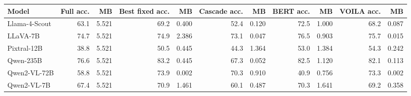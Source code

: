 \begin{tabular}{lrrrrrrrrrr}
\toprule
Model & Full acc. & MB & Best fixed acc. & MB & Cascade acc. & MB & BERT acc. & MB & VOILA acc. & MB \\
\midrule
Llama-4-Scout & 63.1 & 5.521 & 69.2 & 0.400 & 52.4 & 0.120 & 72.5 & 1.000 & 68.2 & 0.087 \\
LLaVA-7B & 74.7 & 5.521 & 74.9 & 2.386 & 73.1 & 0.047 & 76.5 & 0.903 & 75.7 & 0.015 \\
Pixtral-12B & 38.8 & 5.521 & 50.5 & 0.445 & 44.3 & 1.364 & 53.0 & 1.384 & 54.3 & 0.242 \\
Qwen-235B & 76.6 & 5.521 & 83.2 & 0.445 & 67.3 & 0.052 & 82.5 & 1.120 & 82.1 & 0.113 \\
Qwen2-VL-72B & 58.8 & 5.521 & 73.9 & 0.002 & 70.3 & 0.910 & 40.9 & 0.756 & 73.3 & 0.002 \\
Qwen2-VL-7B & 67.4 & 5.521 & 70.9 & 1.461 & 60.1 & 0.487 & 70.3 & 1.641 & 69.2 & 0.358 \\
\bottomrule
\end{tabular}
